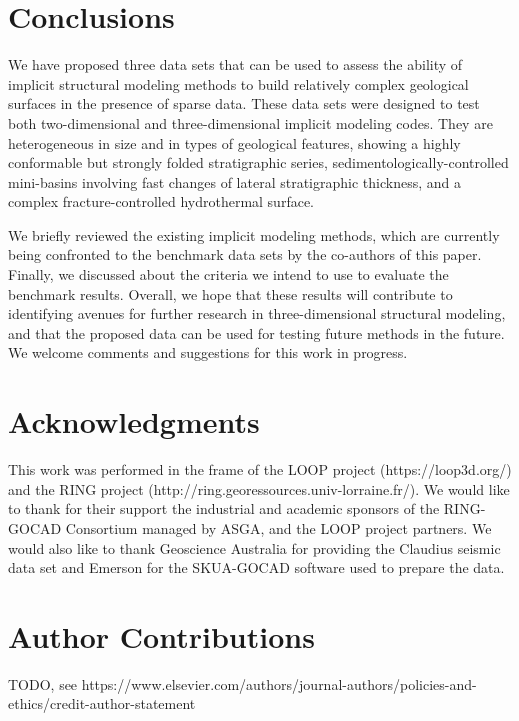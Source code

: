 \documentclass[preprint]{elsarticle}
\begin{document}


\section*{Conclusions}

We have proposed three data sets that can be used to assess the ability of implicit structural modeling methods to build relatively complex geological surfaces in the presence of sparse data. These data sets were designed to test both two-dimensional and three-dimensional implicit modeling codes. They are heterogeneous in size and in types of geological features, showing a highly conformable but strongly folded stratigraphic series, sedimentologically-controlled mini-basins involving fast changes of lateral stratigraphic thickness, and a complex fracture-controlled hydrothermal surface. 

We briefly reviewed the existing implicit modeling methods, which are currently being confronted to the benchmark data sets by the co-authors of this paper. Finally, we discussed about the criteria we intend to use to evaluate the benchmark results. 
Overall, we hope that these results will contribute to identifying avenues for further research in three-dimensional structural modeling, and that the proposed data can be used for testing future methods in the future. We welcome comments and suggestions for this work in progress. 

\section*{Acknowledgments}

This work was performed in the frame of the LOOP project (https://loop3d.org/) and the RING project (http://ring.georessources.univ-lorraine.fr/). We would like to thank for their support the industrial and academic sponsors of the RING-GOCAD Consortium managed by ASGA, and the LOOP project partners. We would also like to thank Geoscience Australia for providing the Claudius seismic data set and Emerson for the SKUA-GOCAD software used to prepare the data. 

\section*{Author Contributions}
 TODO, see https://www.elsevier.com/authors/journal-authors/policies-and-ethics/credit-author-statement



\end{document}
